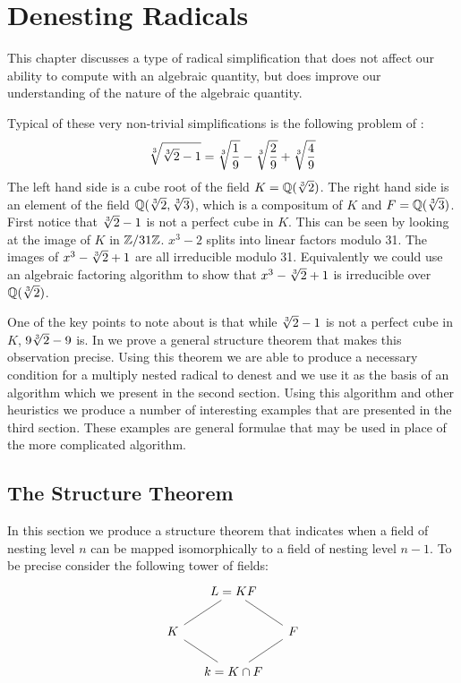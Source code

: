 \chapter{Denesting Radicals}
\label{Denesting:Chap}

This chapter discusses a type of radical simplification that does not
affect our ability to compute with an algebraic quantity, but does
improve our understanding of the nature of the algebraic quantity.

Typical of these very non-trivial simplifications is the following problem
of {\Ramanujan} \cite{Ramanujuan:Problems}:
\begin{equation}
\label{Cube:2:Radical:Eq}
\root 3 \of{\root 3 \of 2 -1} = \root 3 \of {1 \over 9} - 
\root 3 \of {2 \over 9} + \root 3 \of {4 \over 9}
\end{equation}
The left hand side is a cube root of the field $K = \Q(\root 3 \of 2)$.
The right hand side is an element of the field $\Q(\root 3 \of 2, \root 3
\of 3)$, which is a compositum of $K$ and $F = \Q(\root 3 \of 3)$.  First
notice that $\root 3 \of 2 - 1$ is not a perfect cube in $K$.  This can be
seen by looking at the image of $K$ in $\mathbb{Z}/31\mathbb{Z}$.  $x^3 - 2$ splits into
linear factors modulo 31.  The images of $x^3 - \root 3 \of 2 + 1$ are all
irreducible modulo 31.  Equivalently we could use an algebraic factoring
algorithm to show that $x^3 - \root 3 \of 2 + 1$ is irreducible over
$\Q(\root 3 \of 2)$.

One of the key points to note about  is that
while $\root 3 \of 2 - 1$ is not a perfect cube in $K$, $9 \root 3 \of 2 -
9$ is.  In  we prove a general structure
theorem that makes this observation precise.  Using this theorem we are
able to produce a necessary condition for a multiply nested radical to
denest and we use it as the basis of an algorithm which we present in the
second section.  Using this algorithm and other heuristics we produce a
number of interesting examples that are presented in the third section.
These examples are general formulae that may be used in place of the more
complicated algorithm.

\section{The Structure Theorem}
\label{Denesting:Structure:Sec}

In this section we produce a structure theorem that indicates 
when a field of nesting level $n$ can be mapped isomorphically to a field
of nesting level $n - 1$.  To be precise consider the following tower
of fields: 
\[
\begin{tikzcd}[column sep=small]
                            &L=KF \arrow[dash]{ld} \arrow[dash]{rd}  & \\
K \arrow[dash]{rd} & & F\arrow[dash]{ld} \\
& k= K\cap F & 
\end{tikzcd}
\]

